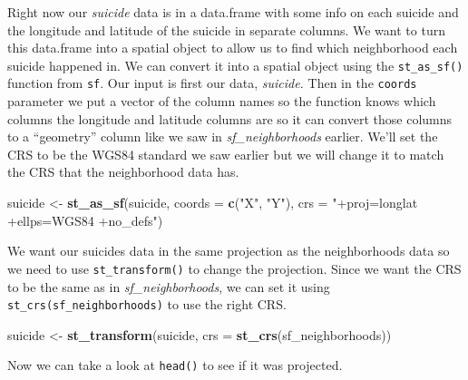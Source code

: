 \documentclass[
  12pt,
]{book}
\newenvironment{Shaded}{\begin{snugshade}}{\end{snugshade}}
\newcommand{\DataTypeTok}[1]{\textcolor[rgb]{0.27,0.27,0.27}{#1}}
\newcommand{\KeywordTok}[1]{\textcolor[rgb]{0.27,0.27,0.27}{\textbf{#1}}}
\newcommand{\NormalTok}[1]{#1}
\newcommand{\StringTok}[1]{\textcolor[rgb]{0.5,0.5,0.5}{#1}}
\begin{document}
Right now our \emph{suicide} data is in a data.frame with some info on each suicide and the longitude and latitude of the suicide in separate columns. We want to turn this data.frame into a spatial object to allow us to find which neighborhood each suicide happened in. We can convert it into a spatial object using the \texttt{st\_as\_sf()} function from \texttt{sf}. Our input is first our data, \emph{suicide.} Then in the \texttt{coords} parameter we put a vector of the column names so the function knows which columns the longitude and latitude columns are so it can convert those columns to a ``geometry'' column like we saw in \emph{sf\_neighborhoods} earlier. We'll set the CRS to be the WGS84 standard we saw earlier but we will change it to match the CRS that the neighborhood data has.

\begin{Shaded}
\begin{Highlighting}[]
\NormalTok{suicide \textless{}{-}}\StringTok{ }\KeywordTok{st\_as\_sf}\NormalTok{(suicide, }
                    \DataTypeTok{coords =} \KeywordTok{c}\NormalTok{(}\StringTok{"X"}\NormalTok{, }\StringTok{"Y"}\NormalTok{),}
                    \DataTypeTok{crs =} \StringTok{"+proj=longlat +ellps=WGS84 +no\_defs"}\NormalTok{)}
\end{Highlighting}
\end{Shaded}

We want our suicides data in the same projection as the neighborhoods data so we need to use \texttt{st\_transform()} to change the projection. Since we want the CRS to be the same as in \emph{sf\_neighborhoods}, we can set it using \texttt{st\_crs(sf\_neighborhoods)} to use the right CRS.

\begin{Shaded}
\begin{Highlighting}[]
\NormalTok{suicide \textless{}{-}}\StringTok{ }\KeywordTok{st\_transform}\NormalTok{(suicide, }
                        \DataTypeTok{crs =} \KeywordTok{st\_crs}\NormalTok{(sf\_neighborhoods))}
\end{Highlighting}
\end{Shaded}

Now we can take a look at \texttt{head()} to see if it was projected.
\end{document}
